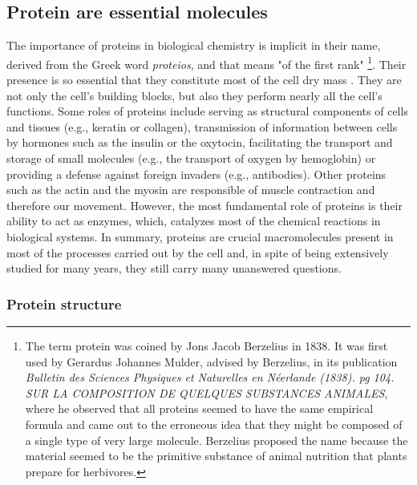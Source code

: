 \documentclass[12pt, b5paper,twoside]{tesi_upf}
\begin{document}
\subsection{Protein are essential molecules}




\par The importance of proteins in biological chemistry is implicit in their name, derived from the Greek word \textit{proteios}, and that means "of the first rank" \footnote{The term protein was coined by Jons Jacob Berzelius in 1838. It was first used by Gerardus Johannes Mulder, advised by Berzelius, in its publication  \textit{Bulletin des Sciences Physiques et Naturelles en N\'eerlande (1838). pg 104. SUR LA COMPOSITION DE QUELQUES SUBSTANCES ANIMALES}, where he observed that all proteins seemed to have the same empirical formula and came out to the erroneous idea that they might be composed of a single type of very large molecule. Berzelius proposed the name because the material seemed to be the primitive substance of animal nutrition that plants prepare for herbivores.}. Their presence is so essential that they  constitute most of the cell dry mass \cite{kessel2010}. They are not only the cell's building blocks, but also they perform nearly all the cell's functions. Some roles of proteins include serving as structural components of cells and tissues (e.g., keratin or collagen), transmission of information between cells by hormones such as the insulin or the oxytocin, facilitating the transport and storage of small molecules (e.g., the transport of oxygen by hemoglobin) or providing a defense against foreign invaders (e.g., antibodies). Other proteins such as the actin and the myosin are responsible of muscle contraction and therefore our movement. However, the most fundamental role of proteins is their ability to act as enzymes, which, catalyzes most of the chemical reactions in biological systems. In summary, proteins are crucial macromolecules present in most of the processes carried out by the cell and, in spite of being extensively studied for many years, they still carry many unanswered questions.    
  

\subsubsection{Protein structure}
\end{document}
